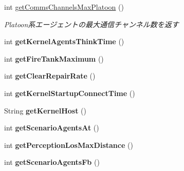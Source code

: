 \begin{DoxyCompactItemize}
int \hyperlink{classadf_1_1agent_1_1info_1_1ScenarioInfo_a280a7ae14478f58e19d7fc63dd7ce5b0}{get\+Comms\+Channels\+Max\+Platoon} ()
\begin{DoxyCompactList}\small\item\em Platoon系エージェントの最大通信チャンネル数を返す \end{DoxyCompactList}\item 
\hypertarget{classadf_1_1agent_1_1info_1_1ScenarioInfo_aada0b54a887cfc1b6295881a4c385510}{}\label{classadf_1_1agent_1_1info_1_1ScenarioInfo_aada0b54a887cfc1b6295881a4c385510} 
int {\bfseries get\+Kernel\+Agents\+Think\+Time} ()
\item 
\hypertarget{classadf_1_1agent_1_1info_1_1ScenarioInfo_a199444ce1888887c0238a11b5a53c4f6}{}\label{classadf_1_1agent_1_1info_1_1ScenarioInfo_a199444ce1888887c0238a11b5a53c4f6} 
int {\bfseries get\+Fire\+Tank\+Maximum} ()
\item 
\hypertarget{classadf_1_1agent_1_1info_1_1ScenarioInfo_a965e5fc981f4c7320469b0a170801bbd}{}\label{classadf_1_1agent_1_1info_1_1ScenarioInfo_a965e5fc981f4c7320469b0a170801bbd} 
int {\bfseries get\+Clear\+Repair\+Rate} ()
\item 
\hypertarget{classadf_1_1agent_1_1info_1_1ScenarioInfo_ad4f035327f2801b1aa9a3ab445753d84}{}\label{classadf_1_1agent_1_1info_1_1ScenarioInfo_ad4f035327f2801b1aa9a3ab445753d84} 
int {\bfseries get\+Kernel\+Startup\+Connect\+Time} ()
\item 
\hypertarget{classadf_1_1agent_1_1info_1_1ScenarioInfo_acef2ce57987aac8baaea19b789ec0591}{}\label{classadf_1_1agent_1_1info_1_1ScenarioInfo_acef2ce57987aac8baaea19b789ec0591} 
String {\bfseries get\+Kernel\+Host} ()
\item 
\hypertarget{classadf_1_1agent_1_1info_1_1ScenarioInfo_a00bbfc3e961ce61434adbf49c317d9d4}{}\label{classadf_1_1agent_1_1info_1_1ScenarioInfo_a00bbfc3e961ce61434adbf49c317d9d4} 
int {\bfseries get\+Scenario\+Agents\+At} ()
\item 
\hypertarget{classadf_1_1agent_1_1info_1_1ScenarioInfo_ad502b1d6fdf235aa01340b5b1617c7cd}{}\label{classadf_1_1agent_1_1info_1_1ScenarioInfo_ad502b1d6fdf235aa01340b5b1617c7cd} 
int {\bfseries get\+Perception\+Los\+Max\+Distance} ()
\item 
\hypertarget{classadf_1_1agent_1_1info_1_1ScenarioInfo_a98f25b5689409088384cfd2f4bdb8aec}{}\label{classadf_1_1agent_1_1info_1_1ScenarioInfo_a98f25b5689409088384cfd2f4bdb8aec} 
int {\bfseries get\+Scenario\+Agents\+Fb} ()
\item 
\hypertarget{classadf_1_1agent_1_1info_1_1ScenarioInfo_ac4cd83f082fcc1a2d2b18256f8c5b623}{}\label{classadf_1_1agent_1_1info_1_1ScenarioInfo_ac4cd83f082fcc1a2d2b18256f8c5b623} 

\end{DoxyCompactItemize}
